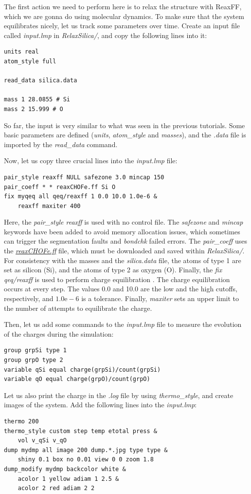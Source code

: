 \documentclass[9pt,tutorial]{livecoms}
\begin{document}
The first action we need to perform here is to relax the structure with ReaxFF,
which we are gonna do using molecular dynamics. To make sure that the system
equilibrates nicely, let us track some parameters over time. Create an input
file called \textit{input.lmp} in \textit{RelaxSilica/}, and copy the following
lines into it:
{\normalsize \begin{verbatim}
units real
atom_style full

read_data silica.data

mass 1 28.0855 # Si
mass 2 15.999 # O
\end{verbatim}}
So far, the input is very similar to what was seen in the previous tutorials.
Some basic parameters are defined (\textit{units}, \textit{atom\_style} and \textit{masses}),
and the \textit{.data} file is imported by the \textit{read\_data} command.

Now, let us copy three crucial lines into the \textit{input.lmp} file:
{\normalsize \begin{verbatim}
pair_style reaxff NULL safezone 3.0 mincap 150
pair_coeff * * reaxCHOFe.ff Si O
fix myqeq all qeq/reaxff 1 0.0 10.0 1.0e-6 &
    reaxff maxiter 400
\end{verbatim}}
Here, the \textit{pair\_style reaxff} is used with no control file. The
\textit{safezone} and \textit{mincap} keywords have been added to avoid memory
allocation issues, which sometimes can trigger the segmentation faults and
\textit{bondchk} failed errors. The \textit{pair\_coeff} uses the
\href{https://raw.githubusercontent.com/lammpstutorials/lammpstutorials-article/main/files/tutorial5/reaxCHOFe.ff}{\textit{reaxCHOFe.ff}}
file, which must be downloaded and saved within \textit{RelaxSilica/}. For
consistency with the masses and the \textit{silica.data} file, the atoms of type 1
are set as silicon (Si), and the atoms of type 2 as oxygen (O). Finally, the
\textit{fix qeq/reaxff} is used to perform charge equilibration \cite{rappe1991charge}.
The charge equilibration occurs at every step. The values 0.0 and 10.0 are the
low and the high cutoffs, respectively, and $1.0 \text{e} -6$ is a tolerance.
Finally, \textit{maxiter} sets an upper limit to the number of attempts to
equilibrate the charge.

Then, let us add some commands to the \textit{input.lmp} file  to measure the
evolution of the charges during the simulation:
{\normalsize \begin{verbatim}
group grpSi type 1
group grpO type 2
variable qSi equal charge(grpSi)/count(grpSi)
variable qO equal charge(grpO)/count(grpO)
\end{verbatim}}
Let us also print the charge in the \textit{.log} file by using \textit{thermo\_style},
and create images of the system. Add the following lines into the \textit{input.lmp}:
{\normalsize \begin{verbatim}
thermo 200
thermo_style custom step temp etotal press &
    vol v_qSi v_qO
dump mydmp all image 200 dump.*.jpg type type &
    shiny 0.1 box no 0.01 view 0 0 zoom 1.8
dump_modify mydmp backcolor white &
    acolor 1 yellow adiam 1 2.5 &
    acolor 2 red adiam 2 2
\end{verbatim}}
\end{document}
